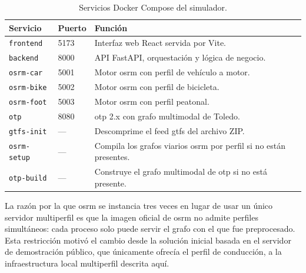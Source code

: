 \begin{table}[htbp]
  \caption{Servicios Docker Compose del simulador.}
  \label{tab:servicios_docker}
  \centering
  \begin{tabular}{llp{6.5cm}}
    \hline
    \textbf{Servicio} & \textbf{Puerto} & \textbf{Función} \\
    \hline
    \texttt{frontend}   & 5173 & Interfaz web React servida por Vite. \\
    \texttt{backend}    & 8000 & API FastAPI, orquestación y lógica de negocio. \\
    \texttt{osrm-car}   & 5001 & Motor \gls{osrm} con perfil de vehículo a motor. \\
    \texttt{osrm-bike}  & 5002 & Motor \gls{osrm} con perfil de bicicleta. \\
    \texttt{osrm-foot}  & 5003 & Motor \gls{osrm} con perfil peatonal. \\
    \texttt{otp}        & 8080 & \gls{otp} 2.x con grafo multimodal de Toledo. \\
    \hline
    \texttt{gtfs-init}  & — & Descomprime el feed \gls{gtfs} del archivo ZIP. \\
    \texttt{osrm-setup} & — & Compila los grafos viarios \gls{osrm} por perfil si no están presentes. \\
    \texttt{otp-build}  & — & Construye el grafo multimodal de \gls{otp} si no está presente. \\
    \hline
  \end{tabular}
\end{table}


La razón por la que \gls{osrm} se instancia tres veces en lugar de usar un único servidor multiperfil es que la imagen oficial de \gls{osrm} no admite perfiles simultáneos: cada proceso solo puede servir el grafo con el que fue preprocesado. Esta restricción motivó el cambio desde la solución inicial basada en el servidor de demostración público, que únicamente ofrecía el perfil de conducción, a la infraestructura local multiperfil descrita aquí.

